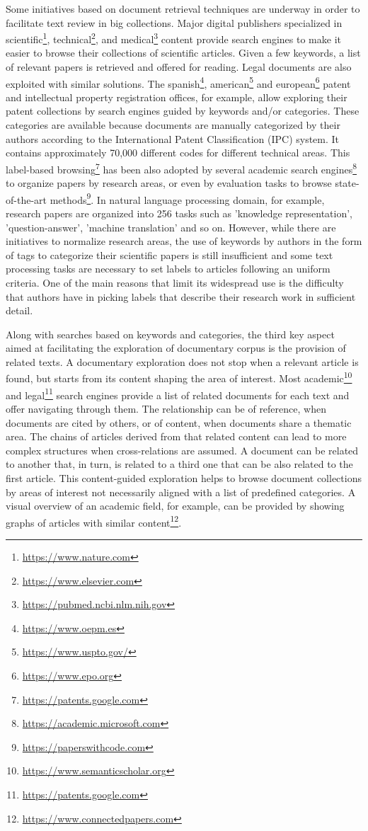 Some initiatives based on document retrieval techniques are underway in order to facilitate text review in big collections. Major digital publishers specialized in scientific\footnote{\url{https://www.nature.com}}, technical\footnote{\url{https://www.elsevier.com}}, and medical\footnote{\url{https://pubmed.ncbi.nlm.nih.gov}} content provide search engines to make it easier to browse their collections of scientific articles. Given a few keywords, a list of relevant papers is retrieved and offered for reading. Legal documents are also exploited with similar solutions. The spanish\footnote{\url{https://www.oepm.es}}, american\footnote{\url{https://www.uspto.gov/}} and european\footnote{\url{https://www.epo.org}} patent and intellectual property registration offices, for example, allow exploring their patent collections by search engines guided by keywords and/or categories. These categories are available because documents are manually categorized by their authors according to the International Patent Classification (IPC) system. It contains approximately 70,000 different codes for different technical areas. This label-based browsing\footnote{\url{https://patents.google.com}} has been also adopted by several academic search engines\footnote{\url{https://academic.microsoft.com}} to organize papers by research areas, or even by evaluation tasks to browse state-of-the-art methods\footnote{\url{https://paperswithcode.com}}. In natural language processing domain, for example, research papers are organized into 256 tasks such as 'knowledge representation', 'question-answer', 'machine translation' and so on. However, while there are initiatives to normalize research areas, the use of keywords by authors in the form of tags to categorize their scientific papers is still insufficient and some text processing tasks are necessary to set labels to articles following an uniform criteria. One of the main reasons that limit its widespread use is the difficulty that authors have in picking labels that describe their research work in sufficient detail.

Along with searches based on keywords and categories, the third key aspect aimed at facilitating the exploration of documentary corpus is the provision of related texts. A documentary exploration does not stop when a relevant article is found, but starts from its content shaping the area of interest. Most academic\footnote{\url{https://www.semanticscholar.org}} and legal\footnote{\url{https://patents.google.com}} search engines provide a list of related documents for each text and offer navigating through them. The relationship can be of reference, when documents are cited by others, or of content, when documents share a thematic area. The chains of articles derived from that related content can lead to more complex structures when cross-relations are assumed. A document can be related to another that, in turn, is related to a third one that can be also related to the first article. This content-guided exploration helps to browse document collections by areas of interest not necessarily aligned with a list of predefined categories. A visual overview of an academic field, for example, can be provided by showing graphs of articles with similar content\footnote{\url{https://www.connectedpapers.com}}.


